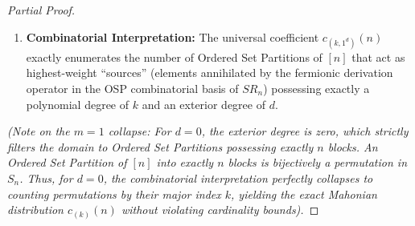 \begin{proof}[Partial Proof]
\begin{enumerate}
    \item \textbf{Combinatorial Interpretation:} The universal coefficient $c_{(k, 1^d)}(n)$ exactly enumerates the number of Ordered Set Partitions of $[n]$ that act as highest-weight ``sources'' (elements annihilated by the fermionic derivation operator in the OSP combinatorial basis of $SR_n$) possessing exactly a polynomial degree of $k$ and an exterior degree of $d$. 
\end{enumerate}

\emph{(Note on the $m=1$ collapse: For $d=0$, the exterior degree is zero, which strictly filters the domain to Ordered Set Partitions possessing exactly $n$ blocks. An Ordered Set Partition of $[n]$ into exactly $n$ blocks is bijectively a permutation in $S_n$. Thus, for $d=0$, the combinatorial interpretation perfectly collapses to counting permutations by their major index $k$, yielding the exact Mahonian distribution $c_{(k)}(n)$ without violating cardinality bounds).}
\end{proof}